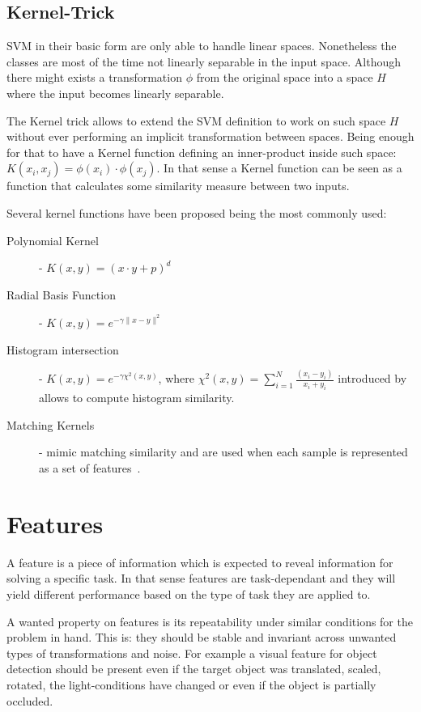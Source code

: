\subsection{Kernel-Trick}
\label{sec:kernel-trick}
\gls{SVM} in their basic form are only able to handle linear spaces.
Nonetheless the classes are most of the time not linearly separable in the input
space. Although there might exists a transformation $\phi$ from the original
space into a space $H$ where the input becomes linearly separable.

The Kernel trick allows to extend the \gls{SVM} definition to work on such space
$H$ without ever performing an implicit transformation between spaces. Being
enough for that to have a Kernel function defining an inner-product inside such
space: $K(x_i, x_j) = \phi(x_i)\cdot\phi(x_j)$.
In that sense a Kernel function can be seen as a function that calculates some
similarity measure between two inputs.

Several kernel functions have been proposed being the most commonly used:

\begin{description}
\item[Polynomial Kernel] - $K(x, y) = (x \cdot y + p)^d$
\item[Radial Basis Function] - $K(x, y) = e^{-\gamma\|x - y \|^2}$
\item[Histogram intersection] - $K(x, y) = e^{-\gamma \chi^2(x,y)}$, where
$\chi^2(x,y) = \sum_{i=1}^{N}\frac{(x_i-y_i)}{x_i+y_i}$ introduced by
\cite{barla2003histogram} allows to compute histogram similarity.
\item[Matching Kernels] - mimic matching similarity and are used when each
sample is represented as a set of features~\citep{boughorbel2005intermediate}.
\end{description}

\section{Features}
A feature is a piece of information which is expected to reveal information for
solving a specific task. In that sense features are task-dependant and they will
yield different performance based on the type of task they are applied to.

A wanted property on features is its repeatability under similar conditions for
the problem in hand. This is: they should be stable and invariant across
unwanted types of transformations and noise. For example a visual feature for
object detection should be present even if the target object was translated,
scaled, rotated, the light-conditions have changed or even if the object is
partially occluded.

